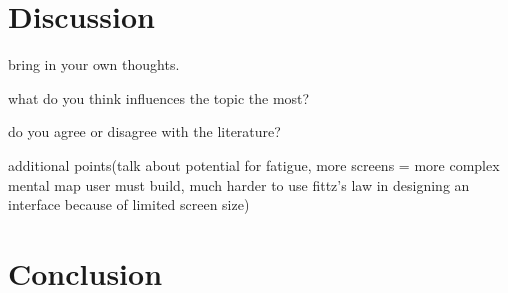 \documentclass[12pt]{article}
\begin{document}
\section{Discussion}

bring in your own thoughts. 

what do you think influences the topic the most?

do you agree or disagree with the literature?

additional points(talk about potential for fatigue, more screens = more complex mental map user must build, much harder to use fittz's law in designing an interface because of limited screen size)

\section{Conclusion}



\end{document}
